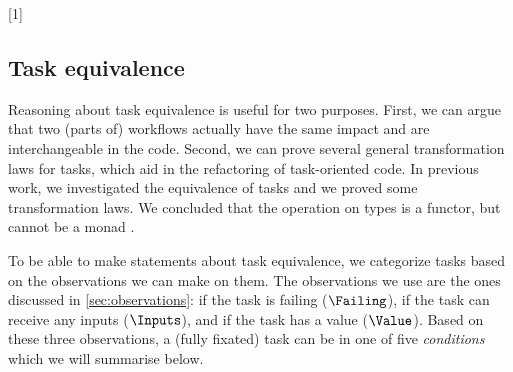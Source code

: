 [1]{} %

\subsection{Task equivalence}
\label{sec:equivalence}

Reasoning about task equivalence is useful for two purposes.
First, we can argue that two (parts of) workflows
actually have the same impact and are interchangeable in the code.
Second, we can prove several general transformation laws for tasks,
which aid in the refactoring of task-oriented code.
%
In previous work, we investigated the equivalence of tasks
and we proved some transformation laws.
We concluded that the  operation on types is a functor,
but cannot be a monad \cite{conf/sfp/KlijnsmaS22}.

To be able to make statements about task equivalence,
we categorize tasks based on the observations we can make on them.
The observations we use are the ones discussed in \cref{sec:observations}:
if the task is failing ($\Failing$),
if the task can receive any inputs ($\Inputs$),
and if the task has a value ($\Value$).
Based on these three observations,
a (fully fixated) task can be in one of five \emph{conditions} which we will summarise below.

